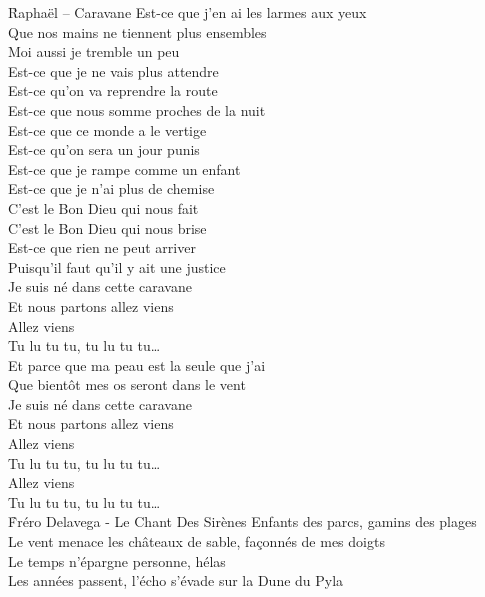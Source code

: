 \documentclass{novel}
\begin{document}
\newpage
\normalsize
\h*{Raphaël – Caravane}
Est-ce que j'en ai les larmes aux yeux \\
Que nos mains ne tiennent plus ensembles \\
Moi aussi je tremble un peu \\
Est-ce que je ne vais plus attendre \\

Est-ce qu'on va reprendre la route \\
Est-ce que nous somme proches de la nuit \\
Est-ce que ce monde a le vertige \\
Est-ce qu'on sera un jour punis \\

Est-ce que je rampe comme un enfant \\
Est-ce que je n'ai plus de chemise \\
C'est le Bon Dieu qui nous fait \\
C'est le Bon Dieu qui nous brise \\

Est-ce que rien ne peut arriver \\
Puisqu'il faut qu'il y ait une justice \\
Je suis né dans cette caravane \\
Et nous partons allez viens \\
Allez viens \\
Tu lu tu tu, tu lu tu tu… \\

Et parce que ma peau est la seule que j'ai \\
Que bientôt mes os seront dans le vent \\
Je suis né dans cette caravane \\
Et nous partons allez viens \\
Allez viens \\
Tu lu tu tu, tu lu tu tu… \\
Allez viens \\
Tu lu tu tu, tu lu tu tu… \\



\newpage
\normalsize
\h*{Fréro Delavega - Le Chant Des Sirènes}
Enfants des parcs, gamins des plages \\
Le vent menace les châteaux de sable, façonnés de mes doigts \\

Le temps n'épargne personne, hélas \\
Les années passent, l'écho s'évade sur la Dune du Pyla \\
\end{document}
